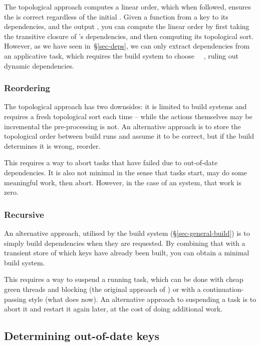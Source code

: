 The topological approach computes a linear order, which when followed, ensures
the  is correct regardless of the initial . Given a function
from a key to its dependencies, and the output , you can compute the
linear order by first taking the transitive closure of 's dependencies,
and then computing its topological sort. However, as we have seen
in~\S\ref{sec-deps}, we can only extract dependencies from an applicative task,
which requires the build system to choose ~\hs{=}~, ruling
out dynamic dependencies.

\subsubsection{Reordering}

The topological approach has two downsides: it is limited to 
build systems and requires a fresh topological sort each time -- while the
actions themselves may be incremental the pre-processing is not. An alternative
approach is to store the topological order between build runs and assume it to
be correct, but if the build determines it is wrong, reorder.

This requires a way to abort tasks that have failed due to out-of-date
dependencies. It is also not minimal in the sense that tasks start, may do some
meaningful work, then abort. However, in the case of an  system,
that work is zero.

\subsubsection{Recursive}

An alternative approach, utilised by the  build system
(\S\ref{sec-general-build}) is to simply build dependencies when they are
requested. By combining that with a transient store of which keys have already
been built, you can obtain a minimal build system.

This requires a way to suspend a running task, which can be done with cheap
green threads and blocking (the original approach of \Shake) or with a
continuation-passing style (what \Shake does now). An alternative approach to
suspending a task is to abort it and restart it again later, at the cost
of doing additional work.

\subsection{Determining out-of-date keys}

